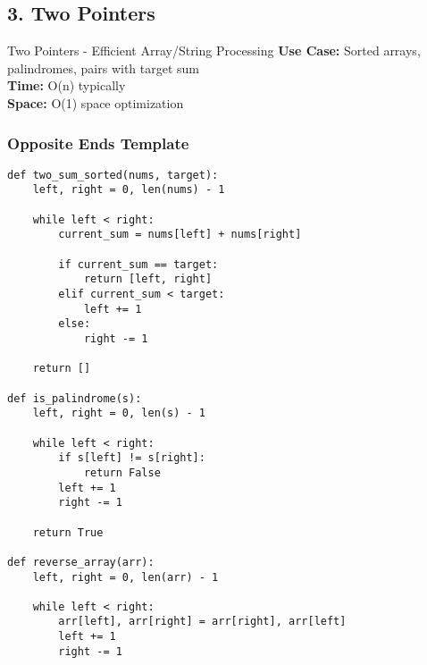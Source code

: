 \documentclass[10pt,a4paper]{article}
\begin{document}
\subsection{3. Two Pointers}

\begin{patternbox}{Two Pointers - Efficient Array/String Processing}
\textbf{Use Case:} Sorted arrays, palindromes, pairs with target sum\\
\textbf{Time:} O(n) typically\\
\textbf{Space:} O(1) space optimization
\end{patternbox}

\subsubsection{Opposite Ends Template}
\begin{lstlisting}
def two_sum_sorted(nums, target):
    left, right = 0, len(nums) - 1

    while left < right:
        current_sum = nums[left] + nums[right]

        if current_sum == target:
            return [left, right]
        elif current_sum < target:
            left += 1
        else:
            right -= 1

    return []

def is_palindrome(s):
    left, right = 0, len(s) - 1

    while left < right:
        if s[left] != s[right]:
            return False
        left += 1
        right -= 1

    return True

def reverse_array(arr):
    left, right = 0, len(arr) - 1

    while left < right:
        arr[left], arr[right] = arr[right], arr[left]
        left += 1
        right -= 1
\end{lstlisting}
\end{document}
